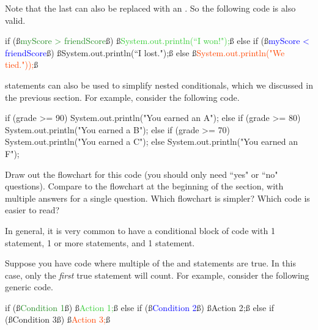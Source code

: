\begin{example}
Note that the last  can also be replaced with an . So the following code is also valid.

\begin{code}
if (ß\textcolor{ForestGreen}{myScore > friendScore}ß) 
{
    ß\textcolor{LimeGreen}{System.out.println(``I won!");}ß
}
else if (ß\textcolor{Blue}{myScore < friendScore}ß)
{
    ß\textcolor{Cerulean}{System.out.println(``I lost.");}ß
}
else
{
    ß\textcolor{OrangeRed}{System.out.println("We tied."));}ß
}
\end{code}

\end{example}

\begin{exercise}
 statements can also be used to simplify nested conditionals, which we discussed in the previous section. For example, consider the following code.

\begin{code}
if (grade >= 90) {
    System.out.println("You earned an A");
} else {
    if (grade >= 80) {
        System.out.println("You earned a B");
    } else {
        if (grade >= 70) {
            System.out.println("You earned a C");
        } else {
            System.out.println("You earned an F");
        }
    }
}
\end{code}

Draw out the flowchart for this code (you should only need ``yes" or ``no" questions). Compare to the flowchart at the beginning of the section, with multiple answers for a single question. Which flowchart is simpler? Which code is easier to read?
\end{exercise}

In general, it is very common to have a conditional block of code with 1  statement, 1 or more  statements, and 1  statement.

Suppose you have code where multiple of the  and  statements are true. In this case, only the \emph{first} true statement will count. For example, consider the following generic code.

\begin{code}
if (ß\textcolor{ForestGreen}{Condition 1}ß) 
{
    ß\textcolor{LimeGreen}{Action 1;}ß
}
else if (ß\textcolor{Blue}{Condition 2}ß)
{
    ß\textcolor{Cerulean}{Action 2;}ß
}
else if (ß\textcolor{Mahogany}{Condition 3}ß)
{
    ß\textcolor{OrangeRed}{Action 3;}ß
}
\end{code}

